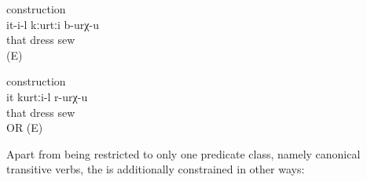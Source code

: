 \begin{exe}

		\ex	{} construction \label{ex:S/he sews a dress@63a}\\
		\gll	it-i-l	kːurtːi	b-urχ-u\\
			that	dress	sew\\
		\glt	{} (E) 

		\ex	{} construction \label{ex:She is a dressmaker@63b}\\
		\gll	it	kurtːi-l	r-urχ-u \\
			that	dress	sew\\
		\glt	{} OR  (E)

\end{exe}

Apart from being restricted to only one predicate class, namely canonical transitive verbs, the  is additionally constrained in other ways:

